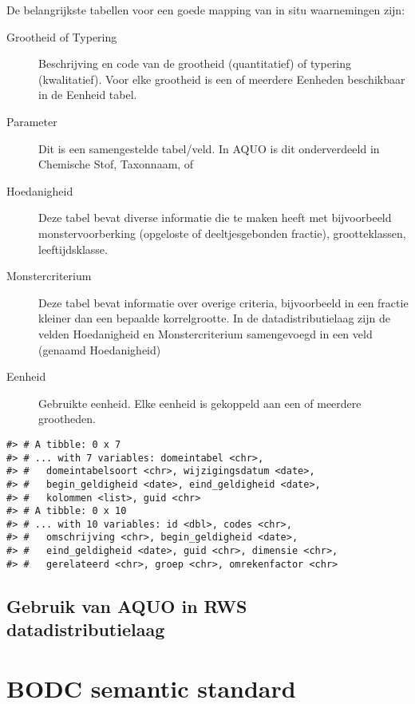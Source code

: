 \documentclass[
]{book}
\begin{document}
De belangrijkste tabellen voor een goede mapping van in situ waarnemingen zijn:

\begin{description}
\item[Grootheid of Typering]
Beschrijving en code van de grootheid (quantitatief) of typering (kwalitatief). Voor elke grootheid is een of meerdere Eenheden beschikbaar in de Eenheid tabel.
\item[Parameter]
Dit is een samengestelde tabel/veld. In AQUO is dit onderverdeeld in Chemische Stof, Taxonnaam, of
\item[Hoedanigheid]
Deze tabel bevat diverse informatie die te maken heeft met bijvoorbeeld monstervoorberking (opgeloste of deeltjesgebonden fractie), grootteklassen, leeftijdsklasse.
\item[Monstercriterium]
Deze tabel bevat informatie over overige criteria, bijvoorbeeld in een fractie kleiner dan een bepaalde korrelgrootte. In de datadistributielaag zijn de velden Hoedanigheid en Monstercriterium samengevoegd in een veld (genaamd Hoedanigheid)
\item[Eenheid]
Gebruikte eenheid. Elke eenheid is gekoppeld aan een of meerdere grootheden.
\end{description}

\begin{verbatim}
#> # A tibble: 0 x 7
#> # ... with 7 variables: domeintabel <chr>,
#> #   domeintabelsoort <chr>, wijzigingsdatum <date>,
#> #   begin_geldigheid <date>, eind_geldigheid <date>,
#> #   kolommen <list>, guid <chr>
#> # A tibble: 0 x 10
#> # ... with 10 variables: id <dbl>, codes <chr>,
#> #   omschrijving <chr>, begin_geldigheid <date>,
#> #   eind_geldigheid <date>, guid <chr>, dimensie <chr>,
#> #   gerelateerd <chr>, groep <chr>, omrekenfactor <chr>
\end{verbatim}

\hypertarget{gebruik-van-aquo-in-rws-datadistributielaag}{%
\section{Gebruik van AQUO in RWS datadistributielaag}\label{gebruik-van-aquo-in-rws-datadistributielaag}}

\hypertarget{bodc-semantic-standard}{%
\chapter{BODC semantic standard}\label{bodc-semantic-standard}}
\end{document}
